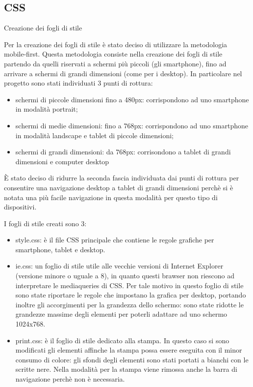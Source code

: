 \subsection{CSS}
Creazione dei fogli di stile

Per la creazione dei fogli di stile è stato deciso di utilizzare la metodologia mobile-first.
Questa metodologia consiste nella creazione dei fogli di stile partendo da quelli riservati a schermi più piccoli (gli smartphone), fino ad arrivare a schermi di grandi dimensioni (come per i desktop).
In particolare nel progetto sono stati individuati 3 punti di rottura:
\begin{itemize}

    \item schermi di piccole dimensioni fino a 480px: corrispondono ad uno smartphone in modalità portrait;
    \item schermi di medie dimensioni: fino a 768px: corrispondono ad uno smartphone in modalità landscape e tablet di piccole dimensioni;
    \item schermi di grandi dimensioni: da 768px: corrisondono a tablet di grandi dimensioni e computer desktop

\end{itemize}

\`E stato deciso di ridurre la seconda fascia individuata dai punti di rottura per consentire una navigazione desktop a tablet di grandi dimensioni perchè si è notata una più facile navigazione in questa modalità per questo tipo di dispositivi.

I fogli di stile creati sono 3:
\begin{itemize}

    \item style.css: è il file CSS principale che contiene le regole grafiche per smartphone, tablet e desktop.
    \item ie.css:  un foglio di stile utile alle vecchie versioni di Internet Explorer (versione minore o uguale a 8), in quanto questi brawser non riescono ad interpretare le mediaqueries di CSS. Per tale motivo in questo foglio di stile sono state riportare le regole che impostano la grafica per desktop, portando inoltre gli accorgimenti per la grandezza dello schermo: sono state ridotte le grandezze massime degli elementi per poterli adattare ad uno schermo 1024x768.
    \item print.css: è il foglio di stile dedicato alla stampa. In questo caso si sono modificati gli elementi affinche la stampa possa essere eseguita con il minor consumo di colore: gli sfondi degli elementi sono stati portati a bianchi con le scritte nere. Nella modalità per la stampa viene rimossa anche la barra di navigazione perchè non è necessaria.

\end{itemize}

